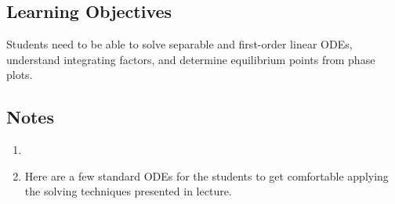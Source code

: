 \subsection*{Learning Objectives}
Students need to be able to solve separable and first-order linear ODEs, understand integrating factors, and determine equilibrium points from phase plots.


\subsection*{Notes}
\begin{enumerate}
    \item 
    \item Here are a few standard ODEs for the students to get comfortable applying the solving techniques presented in lecture.
\end{enumerate}

